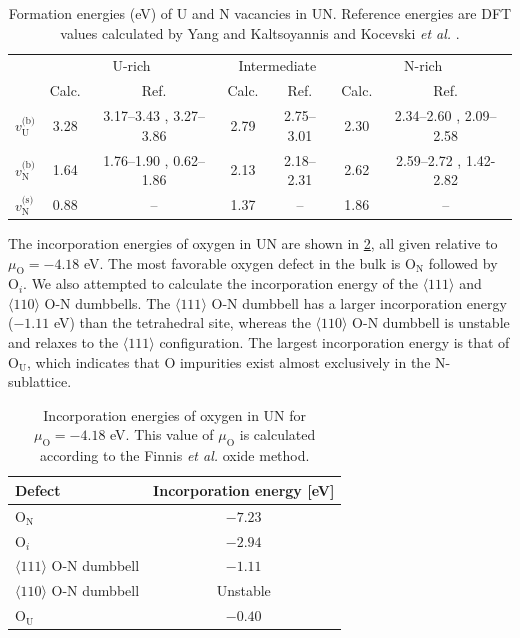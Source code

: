 \documentclass[preprint,12pt,sort&compress]{elsarticle}
\newcommand{\?}{\stackrel{?}{=}}
\begin{document}
\begin{table}[h!]
\scriptsize
\centering
\caption{Formation energies (eV) of U and N vacancies in UN. Reference energies are DFT values calculated by Yang and Kaltsoyannis \cite{Yang2021} and Kocevski \textit{et al.} \cite{Kocevski2022I}.}
\begin{tabular}{l|cc|cc|cc}
\hline
 & \multicolumn{2}{c|}{U-rich} & \multicolumn{2}{c|}{Intermediate} & \multicolumn{2}{c}{N-rich} \\
& Calc. & Ref. & Calc. & Ref. & Calc. & Ref. \\
\hline
$v_\text{U}^\text{(b)}$ & 3.28 & 3.17--3.43 \cite{Yang2021}, 3.27--3.86 \cite{Kocevski2022I} & 2.79 & 2.75--3.01 \cite{Yang2021} & 2.30 & 2.34--2.60 \cite{Yang2021}, 2.09--2.58 \cite{Kocevski2022I} \\
$v_\text{N}^\text{(b)}$ & 1.64 & 1.76--1.90 \cite{Yang2021}, 0.62--1.86 \cite{Kocevski2022I} & 2.13 & 2.18--2.31 \cite{Yang2021} & 2.62 & 2.59--2.72 \cite{Yang2021}, 1.42-2.82 \cite{Kocevski2022I} \\
$v_\text{N}^\text{(s)}$ & 0.88 & --   & 1.37 & -- & 1.86 & --   \\
\hline
\end{tabular}
\label{Tab:EfVN}
\end{table}

The incorporation energies of oxygen in UN are shown in \cref{Tab:Einc}, all given relative to $\mu_\text{O} = - 4.18$ eV. The most favorable oxygen defect in the bulk is $\text{O}_\text{N}$ followed by $\text{O}_i$. We also attempted to calculate the incorporation energy of the $\langle 111 \rangle$ and $\langle 110 \rangle$ O-N dumbbells. The $\langle 111 \rangle$ O-N dumbbell has a larger incorporation energy ($-1.11$ eV) than the tetrahedral site, whereas the $\langle 110 \rangle$ O-N dumbbell is unstable and relaxes to the $\langle 111 \rangle$ configuration. The largest incorporation energy is that of $\text{O}_\text{U}$, which indicates that O impurities exist almost exclusively in the N-sublattice.

\begin{table}[h!]
\centering
\caption{Incorporation energies of oxygen in UN for $\mu_\text{O} = - 4.18$ eV. This value of $\mu_\text{O}$ is calculated according to the Finnis \textit{et al.} \cite{Finnis2005} oxide method.}
\footnotesize
\begin{tabular}{lc}
\hline
Defect & Incorporation energy [eV] \\
\hline
O$_\text{N}$ & $-7.23$ \\
O$_i$          & $-2.94$ \\
$\langle 111 \rangle$ O-N dumbbell & $-1.11$ \\
$\langle 110 \rangle$ O-N dumbbell & Unstable \\
O$_\text{U}$ & $-0.40$ \\
\hline
\end{tabular}
\label{Tab:Einc}
\end{table}
\end{document}
